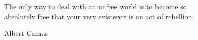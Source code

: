 
The only way to deal with an unfree world is to become so \\
absolutely free that your very existence is an act of rebellion. 

Albert Camus
